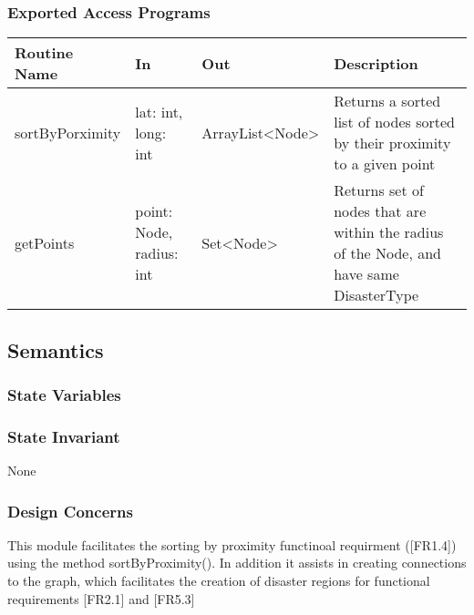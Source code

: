 \documentclass[12pt]{article}
\begin{document}
                
                \subsubsection* {Exported Access Programs}
                

                \begin{tabular}{| l | l | l | p{5cm} |}
                    \hline
                    \textbf{Routine Name} & \textbf{In} & \textbf{Out} & \textbf{Description}\\
                    \hline
                    sortByPorximity&lat: int, long: int&ArrayList<Node>& Returns a sorted list of nodes sorted by their proximity to a given point\\
                    \hline
                    getPoints&point: Node, radius: int&Set<Node>& Returns set of nodes that are within the radius of the Node, and have same DisasterType\\
                    \hline
                    \end{tabular}
                
                \subsection* {Semantics}
                
                \subsubsection* {State Variables}
                                
                \subsubsection* {State Invariant}
                None
                \subsubsection* {Design Concerns}
                This module facilitates the sorting by proximity functinoal requirment ([FR1.4]) using the method sortByProximity().
                In addition it assists in creating connections to the graph, which facilitates the creation of disaster regions for 
                functional requirements [FR2.1] and [FR5.3]

                \newpage
\end{document}
